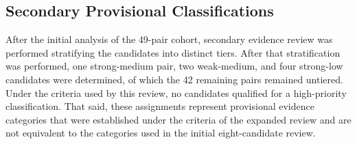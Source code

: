 \documentclass[11pt]{article}
\begin{document}
\subsection{Secondary Provisional Classifications}
After the initial analysis of the 49-pair cohort, secondary evidence review was performed stratifying the candidates into distinct tiers. After that stratification was performed, one strong-medium pair, two weak-medium, and four strong-low candidates were determined, of which the 42 remaining pairs remained untiered. Under the criteria used by this review, no candidates qualified for a high-priority classification. That said, these assignments represent provisional evidence categories that were established under the criteria of the expanded review and are not equivalent to the categories used in the initial eight-candidate review.
\end{document}
